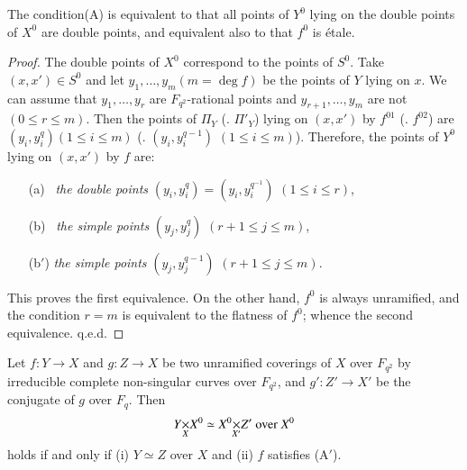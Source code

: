 \begin{subprop}\label{art6-subprop4.2.5}
The condition\pageoriginale (A) is equivalent to that all points of $Y^0$ lying on the double points of $X^0$ are double points, and equivalent also to that $f^0$ is \'etale.
\end{subprop}

\begin{proof}
The double points of $X^0$ correspond to the points of $S^0$. Take $(x, x') \in S^0$ and let $y_1, \ldots, y_m (m = \deg f)$ be the points of $Y$ lying on $x$. We can assume that $y_1, \ldots, y_r$ are $F_{q^2}$-rational points and $y_{r+1}, \ldots, y_m$ are not $(0 \leqslant r \leqslant m)$. Then the points of $\Pi_Y$ (\resp. $\Pi'_Y$) lying on $(x, x')$ by $f^{01}$ (\resp. $f^{02}$) are $(y_i, y^q_i) (1 \leqslant i \leqslant m)$ (\resp. $(y_i, y^{q-1}_i)$ $(1 \leqslant i \leqslant m)$). Therefore, the points of $Y^0$ lying on $(x, x')$ by $f$ are:
\begin{itemize}
\item[(a)~] \textit{the double points} \quad $(y_i, y^q_i) = (y_i, y^{q^{-1}}_i)$ \hfill$(1\leqslant i \leqslant r)$,

\item[(b)~] \textit{the simple points} \quad $(y_j, y^q_j)$ \hfill $(r + 1 \leqslant  j \leqslant m)$,

\item[(b$'$)] \textit{the simple points} \quad $(y_j, y^{q-1}_j)$ \hfill$(r+1 \leqslant j \leqslant m)$.
\end{itemize}
This proves the first equivalence. On the other hand, $f^0$ is always unramified, and the condition $r =m$ is equivalent to the flatness of $f^0$; whence the second equivalence. q.e.d.
\end{proof}

\begin{sublemma}\label{art6-sublem4.2.6}
Let $f : Y \to X$ and $g : Z \to X$ be two unramified coverings of $X$ over $F_{q^2}$ by irreducible complete non-singular curves over $F_{q^2}$, and $g' : Z' \to X'$ be the conjugate of $g$ over $F_q$. Then
$$
\fprod{Y}{X^0}{X} \simeq \fprod{X^0}{Z'}{X'} \text{ over } X^0
$$
holds if and only if (i) $Y \simeq Z$ over $X$ and (ii) $f$ satisfies (A$'$).
\end{sublemma}

